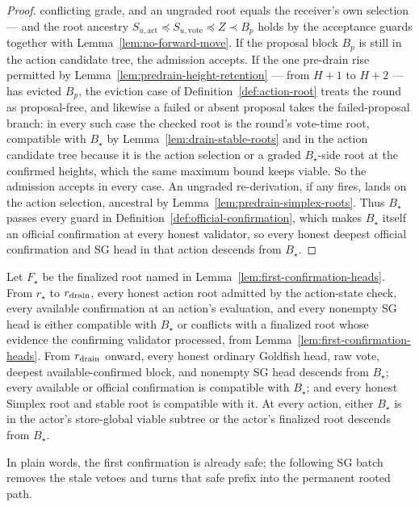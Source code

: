 \begin{proof}
conflicting grade, and an ungraded root equals the receiver's own
selection --- and the root ancestry
\(S_{u,\mathrm{act}}\preceq S_{u,\mathrm{vote}}\preceq Z\prec
B_p\) holds by the acceptance guards together with
Lemma~\ref{lem:no-forward-move}.  If the proposal block \(B_p\) is
still in the action candidate tree, the admission accepts.  If the one
pre-drain rise permitted by Lemma~\ref{lem:predrain-height-retention}
--- from \(H+1\) to \(H+2\) --- has evicted \(B_p\), the eviction
case of Definition~\ref{def:action-root} treats the round as
proposal-free, and likewise a failed or absent proposal takes the
failed-proposal branch: in every such case the checked root is the
round's vote-time root, compatible with \(B_\star\) by
Lemma~\ref{lem:drain-stable-roots} and in the action candidate tree
because it is the action selection or a graded \(B_\star\)-side root
at the confirmed heights, which the same maximum bound keeps viable.
So the admission accepts in every case.  An ungraded re-derivation, if
any fires, lands on the action selection, ancestral by
Lemma~\ref{lem:predrain-simplex-roots}.
Thus \(B_\star\) passes every guard in
Definition~\ref{def:official-confirmation}, which makes \(B_\star\) itself an
official confirmation at every honest validator, so every honest deepest
official confirmation and SG head in that action descends from
\(B_\star\).
\end{proof}

\begin{lemma}
\label{lem:first-confirmation-persists}
Let \(F_\star\) be the finalized root named in
Lemma~\ref{lem:first-confirmation-heads}.  From \(r_\star\) to
\(r_{\rm drain}\), every
honest action root admitted by the action-state check, every available
confirmation at an action's evaluation, and every nonempty SG head is either
compatible with \(B_\star\) or conflicts with a finalized root whose
evidence the confirming validator processed, from
Lemma~\ref{lem:first-confirmation-heads}.  From
\(r_{\rm drain}\) onward, every honest ordinary Goldfish head, raw vote,
deepest available-confirmed block, and nonempty SG head descends from
\(B_\star\); every available or official confirmation is compatible with
\(B_\star\); and every honest Simplex root and stable root is compatible
with it.  At every action, either \(B_\star\) is in the actor's store-global
viable subtree or the actor's finalized root descends from \(B_\star\).

In plain words, the first confirmation is already safe; the following SG
batch removes the stale vetoes and turns that safe prefix into the permanent
rooted path.
\end{lemma}

